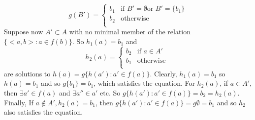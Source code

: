 \begin{enumerate}
    \begin{equation*}
g(B')= \left\{
\begin{array}{ll}
b_1 & \text{if } B'=\emptyset \text{or } B'=\{b_1\}\\
b_2 & \text{otherwise } \\
\end{array} \right.
\end{equation*}
    Suppose now $A' \subset A$ with no minimal member of the relation $\{<a,b>: a \in f(b)\}$. So $h_1(a)=b_1$ and
    \begin{equation*}
h_2(a)= \left\{
\begin{array}{ll}
b_2 & \text{if } a \in A'\\
b_1 & \text{otherwise } \\
\end{array} \right.
\end{equation*}
are solutions to $h(a)=g\{h(a'): a' \in f(a)\}$. Clearly, $h_1(a)=b_1$ so $h(a)=b_1$ and so $g\{b_1\}=b_1$, which satisfies the equation. For $h_2(a)$, if $a \in A'$, then $\exists a' \in f(a)$ and $\exists a'' \in a'$ etc. So $g\{h(a'): a' \in f(a)\} =b_2=h_2(a)$.\\
 Finally, If $a \not \in A', h_2(a)=b_1$, then $g\{h(a'): a' \in f(a)\}=g \emptyset =b_1$ and so $h_2$ also satisfies the equation.\\
\end{enumerate}
